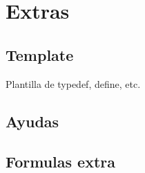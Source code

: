 \documentclass[10pt,landscape,twocolumn,letterpaper,twosided]{article}
\newcommand\cppfile[2][]{

}
\begin{document}
	\section{Extras}
		\subsection{Template}
			Plantilla de typedef, define, etc.
			\cppfile[1-29]{otros/template.cpp}
		
		\subsection{Ayudas}
			\cppfile[34-62]{otros/template.cpp}
		
		\subsection{Formulas extra}
			
\end{document}
